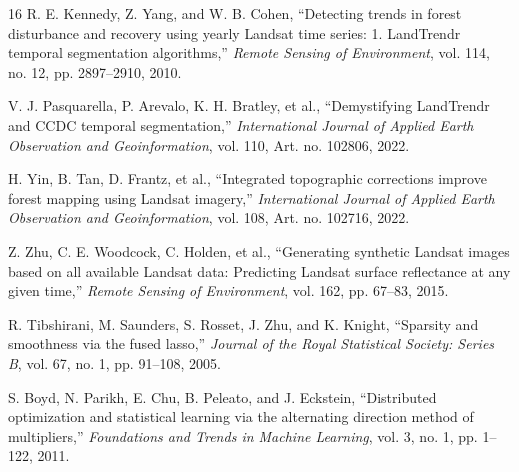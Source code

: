 \documentclass[letterpaper,journal]{IEEEtran}
\begin{document}
\begin{thebibliography}{16}
R. E. Kennedy, Z. Yang, and W. B. Cohen, ``Detecting trends in forest disturbance and recovery using yearly Landsat time series: 1. LandTrendr temporal segmentation algorithms,'' \textit{Remote Sensing of Environment}, vol. 114, no. 12, pp. 2897--2910, 2010.

V. J. Pasquarella, P. Arevalo, K. H. Bratley, et al., ``Demystifying LandTrendr and CCDC temporal segmentation,'' \textit{International Journal of Applied Earth Observation and Geoinformation}, vol. 110, Art. no. 102806, 2022.

H. Yin, B. Tan, D. Frantz, et al., ``Integrated topographic corrections improve forest mapping using Landsat imagery,'' \textit{International Journal of Applied Earth Observation and Geoinformation}, vol. 108, Art. no. 102716, 2022.

Z. Zhu, C. E. Woodcock, C. Holden, et al., ``Generating synthetic Landsat images based on all available Landsat data: Predicting Landsat surface reflectance at any given time,'' \textit{Remote Sensing of Environment}, vol. 162, pp. 67--83, 2015.

R. Tibshirani, M. Saunders, S. Rosset, J. Zhu, and K. Knight, ``Sparsity and smoothness via the fused lasso,'' \textit{Journal of the Royal Statistical Society: Series B}, vol. 67, no. 1, pp. 91--108, 2005.

S. Boyd, N. Parikh, E. Chu, B. Peleato, and J. Eckstein, ``Distributed optimization and statistical learning via the alternating direction method of multipliers,'' \textit{Foundations and Trends in Machine Learning}, vol. 3, no. 1, pp. 1--122, 2011.

\end{thebibliography}
\end{document}
